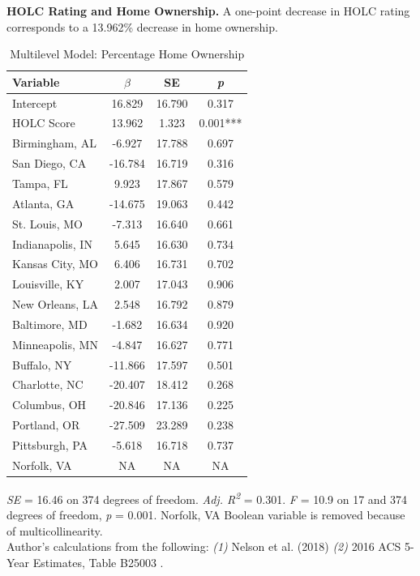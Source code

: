 \documentclass[paper=letter, fontsize=12pt]{scrartcl} %
\begin{document}
	\begin{table}
		\textbf{HOLC Rating and Home Ownership.} A one-point decrease in HOLC rating corresponds to a 13.962\% decrease in home ownership.
		\caption{Multilevel Model: Percentage Home Ownership}
		\begin{center}
			\begin{tabular}{|| l | c c c ||}
				\hline
				Variable & $\beta$ & SE & \textit{p} \\
				\hline \hline
				Intercept & 16.829 & 16.790 & 0.317\\
				\hline 
				HOLC Score & 13.962 & 1.323 & 0.001***\\
				\hline 
				Birmingham, AL & -6.927 & 17.788 & 0.697\\
				\hline 
				San Diego, CA & -16.784 & 16.719 & 0.316\\ 
				\hline 
				Tampa, FL & 9.923 & 17.867 & 0.579\\
				\hline 
				Atlanta, GA & -14.675 & 19.063 & 0.442\\
				\hline 
				St. Louis, MO & -7.313 & 16.640 & 0.661\\
				\hline 
				Indianapolis, IN & 5.645 & 16.630 & 0.734\\
				\hline 
				Kansas City, MO & 6.406 & 16.731 & 0.702\\
				\hline 
				Louisville, KY & 2.007 & 17.043 & 0.906\\
				\hline 
				New Orleans, LA & 2.548 & 16.792 & 0.879\\
				\hline 
				Baltimore, MD & -1.682 & 16.634 & 0.920\\
				\hline 
				Minneapolis, MN & -4.847 & 16.627 & 0.771\\
				\hline 
				Buffalo, NY & -11.866 & 17.597 & 0.501\\
				\hline 
				Charlotte, NC & -20.407 & 18.412 & 0.268\\
				\hline 
				Columbus, OH & -20.846 & 17.136 & 0.225\\
				\hline 
				Portland, OR & -27.509 & 23.289 & 0.238\\
				\hline 
				Pittsburgh, PA & -5.618 & 16.718 & 0.737\\
				\hline 
				Norfolk, VA & NA & NA & NA\\
				\hline 
			\end{tabular}
		\end{center}
		\textit{SE} = 16.46 on 374 degrees of freedom. \textit{Adj. R\textsuperscript{2}} = 0.301. \textit{F} = 10.9 on 17 and 374 degrees of freedom, \textit{p} = 0.001. Norfolk, VA Boolean variable is removed because of multicollinearity.\\
		Author's calculations from the following: \textit{(1)} Nelson et al. (2018) \cite{richmond} \textit{(2)} 2016 ACS 5-Year Estimates, Table B25003 \cite{acs16}.
	\end{table}
	
\end{document}
